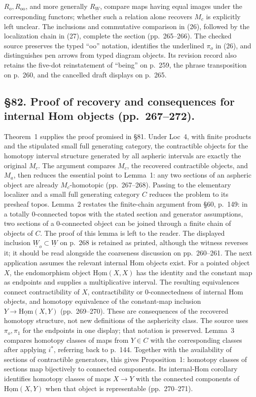 \documentclass[10pt,oneside]{book}
\begin{document}
$R_o,R_{\mathrm{oo}}$, and more generally $R_{\underline{W}}$, compare maps having equal images under the corresponding functors; whether such a relation alone recovers $M_c$ is explicitly left unclear. The inclusions and commutative comparison in (26), followed by the localization chain in (27), complete the section (pp.\ 265--266). The checked source preserves the typed “oo” notation, identifies the underlined $\pi_o$ in (26), and distinguishes pen arrows from typed diagram objects. Its revision record also retains the five-dot reinstatement of “being” on p.\ 259, the phrase transposition on p.\ 260, and the cancelled draft displays on p.\ 265.

\subsection*{\S82. Proof of recovery and consequences for internal Hom objects (pp.\ 267--272).}
Theorem~1 supplies the proof promised in \S81. Under Loc~4, with finite products and the stipulated small full generating category, the contractible objects for the homotopy interval structure generated by all aspheric intervals are exactly the original $M_c$. The argument compares $M_c$, the recovered contractible objects, and $M_a$, then reduces the essential point to Lemma~1: any two sections of an aspheric object are already $M_c$-homotopic (pp.\ 267--268). Passing to the elementary localizer and a small full generating category $C$ reduces the problem to its presheaf topos. Lemma~2 restates the finite-chain argument from \S60, p.\ 149: in a totally 0-connected topos with the stated section and generator assumptions, two sections of a 0-connected object can be joined through a finite chain of objects of $C$. The proof of this lemma is left to the reader. The displayed inclusion $\underline W_o\subset\underline W$ on p.\ 268 is retained as printed, although the witness reverses it; it should be read alongside the coarseness discussion on pp.\ 260--261.
The next application assumes the relevant internal Hom objects exist. For a pointed object $X$, the endomorphism object $\underline{\mathrm{Hom}}(X,X)$ has the identity and the constant map as endpoints and supplies a multiplicative interval. The resulting equivalences connect contractibility of $X$, contractibility or 0-connectedness of internal Hom objects, and homotopy equivalence of the constant-map inclusion $Y\to\underline{\mathrm{Hom}}(X,Y)$ (pp.\ 269--270). These are consequences of the recovered homotopy structure, not new definitions of the asphericity class. The source uses $\pi_o,\pi_1$ for the endpoints in one display; that notation is preserved. Lemma~3 compares homotopy classes of maps from $Y\in C$ with the corresponding classes after applying $i^*$, referring back to p.\ 144. Together with the availability of sections of contractible generators, this gives Proposition~1: homotopy classes of sections map bijectively to connected components. Its internal-Hom corollary identifies homotopy classes of maps $X\to Y$ with the connected components of $\underline{\mathrm{Hom}}(X,Y)$ when that object is representable (pp.\ 270--271).
\end{document}
